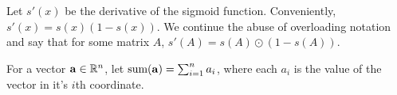 Let $s'(x)$ be the derivative of the sigmoid function. Conveniently, $s'(x) = s(x)(1 - s(x))$. We continue the abuse of overloading notation and say that for some matrix $A$, $s'(A) = s(A)\odot (1 - s(A))$.

For a vector $\mathbf{a}\in\mathbb{R}^{n}$, let $\text{sum}(\mathbf{a}) = \sum_{i = 1}^{n}a_i$, where each $a_i$ is the value of the vector in it's $i$th coordinate.








 












